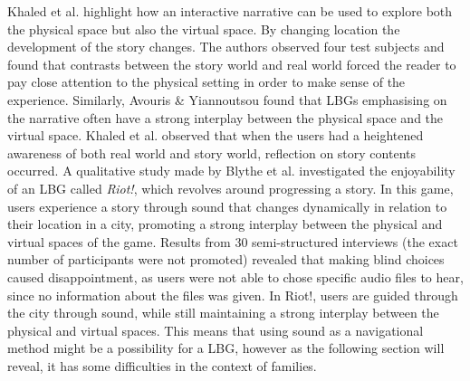 Khaled et al. highlight how an interactive narrative can be used to explore both the physical space but also the virtual space. By changing location the development of the story changes. The authors observed four test subjects and found that contrasts between the story world and real world forced the reader to pay close attention to the physical setting in order to make sense of the experience\cite{StoryTrek}. Similarly, Avouris \& Yiannoutsou found that LBGs emphasising on the narrative often have a strong interplay between the physical space and the virtual space\cite{LBG_Review}. Khaled et al. observed that when the users had a heightened awareness of both real world and story world, reflection on story contents occurred\cite{StoryTrek}. A qualitative study made by Blythe et al. investigated the enjoyability of an LBG called \textit{Riot!}, which revolves around progressing a story\cite{InterdisciplinaryCriticism}. In this game, users experience a story through sound that changes dynamically in relation to their location in a city, promoting a strong interplay between the physical and virtual spaces of the game. Results from 30 semi-structured interviews (the exact number of participants were not promoted) revealed that making blind choices caused disappointment, as users were not able to chose specific audio files to hear, since no information about the files was given. In Riot!, users are guided through the city through sound, while still maintaining a strong interplay between the physical and virtual spaces. This means that using sound as a navigational method might be a possibility for a LBG, however as the following section will reveal, it has some difficulties in the context of families.

